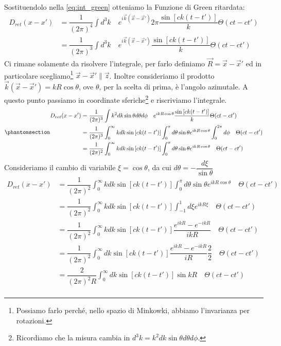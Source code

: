 Sostituendolo nella \eqref{eq:int_green} otteniamo la Funzione di Green ritardata:
\begin{equation}
   \begin{aligned}
        D_{ret}(x-x')&=\dfrac{1}{(2\pi)^4}\int d^3k\quad e^{i\Vec{k}(\Vec{x}-\Vec{x}')}2\pi\dfrac{\sin{[ck(t-t')]}}{k}\Theta(ct-ct')\\
     &=\dfrac{1}{(2\pi)^3}\int d^3k\quad e^{i\Vec{k}(\Vec{x}-\Vec{x}')}\dfrac{\sin{[ck(t-t')]}}{k}\Theta(ct-ct')
   \end{aligned}
\end{equation}
Ci rimane solamente da risolvere l'integrale, per farlo definiamo $\Vec{R}=\Vec{x}-\Vec{x}'$ ed in particolare scegliamo\footnote{Possiamo farlo perché, nello spazio di Minkowki, abbiamo l'invarianza per rotazioni.} $\Vec{x}-\Vec{x}'\parallel \Vec{z}$. Inoltre consideriamo il prodotto $\Vec{k}(\Vec{x}-\Vec{x}')=kR\cos{\theta}$, ove $\theta$, per la scelta di prima, è l'angolo azimutale. A questo punto passiamo in coordinate sferiche\footnote{Ricordiamo che la misura cambia in $d^3k=k^2dk\sin{\theta}d\theta d\phi$.} e riscriviamo l'integrale.
\begin{equation}\phantomsection\label{eq:ret_green}
   \begin{aligned}
        D_{ret}(x-x')&=\dfrac{1}{(2\pi)^3}\int k^2dk\sin{\theta}d\theta d\phi \quad e^{ikR\cos{\theta}}\dfrac{\sin{[ck(t-t')]}}{k}\Theta(ct-ct')\\
        &=\dfrac{1}{(2\pi)^3}\int_0^\infty kdk\sin{[ck(t-t')]}\int_0^\pi d\theta \sin{\theta}e^{ikR\cos{\theta}} \int_0^{2\pi}d\phi \quad\Theta(ct-ct')\\
        &=\dfrac{1}{(2\pi)^2}\int_0^\infty kdk\sin{[ck(t-t')]}\int_0^\pi d\theta \sin{\theta}e^{ikR\cos{\theta}}  \quad\Theta(ct-ct')
   \end{aligned}
\end{equation}
Consideriamo il cambio di variabile $\xi=\cos{\theta}$, da cui $d\theta=-\dfrac{d\xi}{\sin{\theta}}$
\begin{equation}
   \begin{aligned}
        D_{ret}(x-x')&=\dfrac{1}{(2\pi)^2}\int_0^\infty kdk\sin{[ck(t-t')]}\int_0^\pi d\theta \sin{\theta}e^{ikR\cos{\theta}}  \quad\Theta(ct-ct')\\
        &=\dfrac{1}{(2\pi)^2}\int_0^\infty kdk\sin{[ck(t-t')]}\int_{-1}^1 d\xi e^{ikR\xi}  \quad\Theta(ct-ct')\\
        &=\dfrac{1}{(2\pi)^2}\int_0^\infty kdk\sin{[ck(t-t')]} \dfrac{e^{ikR}-e^{-ikR}}{ikR}  \quad\Theta(ct-ct')\\
         &=\dfrac{1}{(2\pi)^2}\int_0^\infty dk\sin{[ck(t-t')]} \dfrac{e^{ikR}-e^{-ikR}}{iR} \dfrac{2}{2} \quad\Theta(ct-ct')\\
          &=\dfrac{2}{(2\pi)^2R}\int_0^\infty dk\sin{[ck(t-t')]} \sin{kR}  \quad\Theta(ct-ct')\\
   \end{aligned}
\end{equation}
